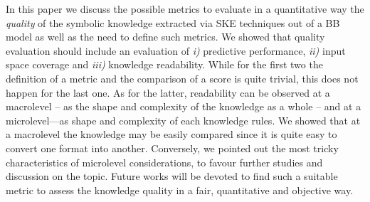 \documentclass[sigconf]{acmart}
\begin{document}
In this paper we discuss the possible metrics to evaluate in a quantitative way the \emph{quality} of the symbolic knowledge extracted via SKE techniques out of a BB model as well as the need to define such metrics.
%
We showed that quality evaluation should include an evaluation of \textit{i)} predictive performance, \textit{ii)} input space coverage and \textit{iii)} knowledge readability.
%
While for the first two the definition of a metric and the comparison of a score is quite trivial, this does not happen for the last one.
%
As for the latter, readability can be observed at a macrolevel -- as the shape and complexity of the knowledge as a whole -- and at a microlevel---as shape and complexity of each knowledge rules.
%
We showed that at a macrolevel the knowledge may be easily compared since it is quite easy to convert one format into another.
%
Conversely, we pointed out the most tricky characteristics of microlevel considerations, to favour further studies and discussion on the topic.
%
Future works will be devoted to find such a suitable metric to assess the knowledge quality in a fair, quantitative and objective way.





\end{document}

